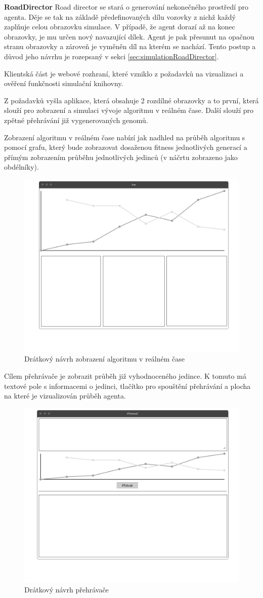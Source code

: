 \textbf{RoadDirector} Road director se stará o generování nekonečného prostředí pro agenta. Děje se tak na základě předefinovaných dílu vozovky z nichž každý zaplňuje celou obrazovku simulace. V případě, že agent dorazí až na konec obrazovky, je mu určen nový navazující dílek. Agent je pak přesunut na opačnou stranu obrazovky a zároveň je vyměněn díl na kterém se nachází. Tento postup a důvod jeho návrhu je rozepsaný v sekci \ref{sec:simulationRoadDirector}.

Klientská část je webové rozhraní, které vzniklo z požadavků na vizualizaci a ověření funkčnosti simulační knihovny. 

Z požadavků vyšla aplikace, která obsahuje 2 rozdílné obrazovky a to první, která slouží pro zobrazení a simulaci vývoje algoritmu v reálném čase. Další slouží pro zpětné přehrávání již vygenerovaných genomů.

Zobrazení algoritmu v reálném čase nabízí jak nadhled na průběh algoritmu s pomocí grafu, který bude zobrazovat dosaženou fitness jednotlivých generací a přímým zobrazením průběhu jednotlivých jedinců (v náčrtu zobrazeno jako obdélníky).
\begin{figure}[H]
	\centering
	\includegraphics[width=0.6\linewidth]{wireframe/main}
	\caption{Drátkový návrh zobrazení algoritmu v reálném čase}
	\label{fig:main}
\end{figure}

Cílem přehrávače je zobrazit průběh již vyhodnoceného jedince. K tomuto má textové pole s informacemi o jedinci, tlačítko pro spouštění přehrávání a plocha na které je vizualizován průběh agenta.
\begin{figure}[H]
	\centering
	\includegraphics[width=0.6\linewidth]{wireframe/player2}
	\caption{Drátkový návrh přehrávače}
	\label{fig:player}
\end{figure}



